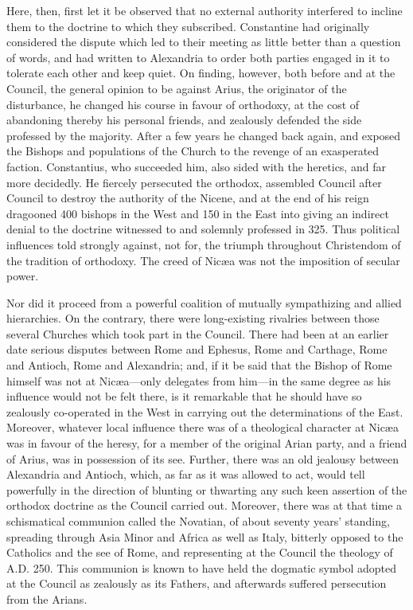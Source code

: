 Here, then, first let it be observed that no
external authority interfered to incline them to the doctrine to which
they subscribed. Constantine had originally considered the dispute
which led to their meeting as little better than a question of words,
and had written to Alexandria to order both parties engaged in it to
tolerate each other and keep quiet. On finding, however, both before
and at the Council, the general opinion to be against Arius, the
originator of the disturbance, he changed his course in favour of
orthodoxy, at the cost of abandoning thereby his personal friends, and
zealously defended the side professed by the majority. After a
few years he changed back again, and exposed the Bishops and
populations of the Church to the revenge of an exasperated faction.
Constantius, who succeeded him, also sided with the heretics, and far
more decidedly. He fiercely persecuted the orthodox, assembled Council
after Council to destroy the authority of the Nicene, and at the end
of his reign dragooned 400 bishops in the West and 150 in the East
into giving an indirect denial to the doctrine witnessed to and
solemnly professed in 325. Thus political influences told strongly
against, not for, the triumph throughout Christendom of the tradition
of orthodoxy. The creed of Nicæa was not the imposition of secular
power.

Nor did it proceed from a powerful coalition of
mutually sympathizing and allied hierarchies. On the contrary, there
were long-existing rivalries between those several Churches which took
part in the Council. There had been at an earlier date serious
disputes between Rome and Ephesus, Rome and Carthage, Rome and
Antioch, Rome and Alexandria; and, if it be said that the Bishop of
Rome himself was not at Nicæa—only delegates from him—in the same
degree as his influence would not be felt there, is it remarkable that
he should have so zealously co-operated in the West in carrying out
the determinations of the East. Moreover, whatever local influence
there was of a theological character at Nicæa was in favour of the
heresy, for a member of the original Arian party, and a friend of
Arius, was in possession of its see. Further, there was an old
jealousy between Alexandria and Antioch, which, as far as it was
allowed to act, would tell powerfully in the direction of blunting or
thwarting any such keen assertion of the orthodox doctrine as the
Council carried out. Moreover, there was at that time a
schismatical communion called the Novatian, of about seventy years'
standing, spreading through Asia Minor and Africa as well as Italy,
bitterly opposed to the Catholics and the see of Rome, and
representing at the Council the theology of A.D.
250. This communion is known to have held the dogmatic symbol adopted
at the Council as zealously as its Fathers, and afterwards suffered
persecution from the Arians.

